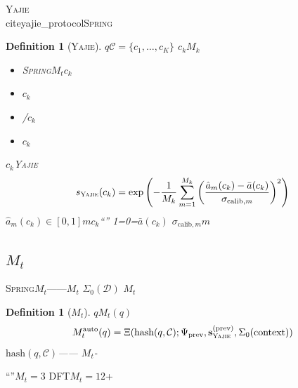 \documentclass[12pt,a4paper]{article}
\newtheorem{definition}[theorem]{Definition}
\theoremstyle{remark}
\newcommand{\D}{\mathcal{D}}
\newcommand{\Spring}{\textsc{Spring}}
\newcommand{\Yajie}{\textsc{Yajie}}
\newcommand{\Mauto}{\ensuremath{M_t^{\text{auto}}}}
\newcommand{\Lyap}{\ensuremath{\Psi}}
\begin{document}
\Yajie{}~\\cite{yajie_protocol}\Spring{}
\textbf{}

\begin{definition}[\Yajie{}]\label{def:cross_modal_yajie}
$q$$\mathcal{C} = \{c_1, \ldots, c_K\}$
$c_k$$M_k$

\begin{itemize}[nosep]
    \item \textbf{} \Spring{}$M_t$$c_k$
    \item \textbf{} $c_k$
    \item \textbf{} /$c_k$
    \item \textbf{} $c_k$
\end{itemize}

$c_k$\Yajie{}
\begin{equation}\label{eq:cross_modal_yajie_score}
    s_{\Yajie}(c_k) = \exp\left(-\frac{1}{M_k}\sum_{m=1}^{M_k}
    \left(\frac{\hat{a}_m(c_k) - \bar{a}(c_k)}{\sigma_{\text{calib}, m}}\right)^2\right)
\end{equation}
$\hat{a}_m(c_k) \in [0,1]$$m$$c_k$“”
1=0=$\bar{a}(c_k)$
$\sigma_{\text{calib}, m}$$m$
\end{definition}

\subsection{$M_t$}

\Spring{}$M_t$——$M_t$
$\Sigma_0(\D)$
$M_t$\textbf{}

\begin{definition}[$M_t$]\label{def:audit_Mt}
$q$$M_t(q)$
\begin{equation}\label{eq:audit_Mt_definition}
    \Mauto(q) = \Xi(\text{hash}(q, \mathcal{C}); \Lyap_{\text{prev}}, \mathbf{s}_{\Yajie}^{(\text{prev})}, \Sigma_0(\text{context}))
\end{equation}
$\text{hash}(q, \mathcal{C})$——
$M_t$-
\end{definition}

\textbf{}
“”$M_t=3$
DFT$M_t=12$+

\subsection{}
\end{document}
